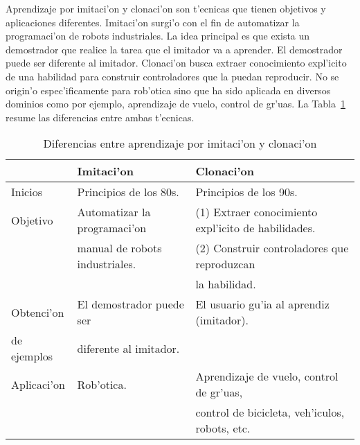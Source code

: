 \documentclass[11pt]{article}
\begin{document}
\textsf{Aprendizaje por imitaci'on} y \textsf{clonaci'on} son t'ecnicas que tienen objetivos y aplicaciones diferentes. Imitaci'on surgi'o con el fin de automatizar la programaci'on de robots industriales. La idea principal es que exista un demostrador que realice la tarea que el imitador va a aprender. El demostrador puede ser diferente al imitador. \textsf{Clonaci'on} busca extraer conocimiento expl'icito de una habilidad para construir controladores que la puedan reproducir. No se origin'o espec'ificamente para rob'otica sino que ha sido aplicada en diversos dominios como por ejemplo, aprendizaje de vuelo, control de gr'uas. La Tabla~\ref{tab:imiclon} resume las diferencias entre ambas t'ecnicas.

\begin{table}[h]
\begin{center}
\begin{small}
\begin{tabular}{|l|l|l|} 

\hline
& \textsf{Imitaci'on}  & \textsf{Clonaci'on}\\
\hline
Inicios & Principios de los 80s.  &    Principios de los 90s.\\ \hline
Objetivo& Automatizar la programaci'on  & (1) Extraer conocimiento expl'icito de habilidades.\\ 
				& manual de robots industriales. & (2) Construir controladores que reproduzcan\\ 
				& 															 & \hspace{0.5cm} la habilidad.\\ \hline
Obtenci'on 		& 	El demostrador puede ser 		 	&  El usuario gu'ia al aprendiz (imitador).\\ 
de ejemplos		& 	diferente al imitador.		 		&  \\ \hline
Aplicaci'on 		& 	Rob'otica. 		 	&  Aprendizaje de vuelo, control de gr'uas,\\ 
											 		& 								 	&  control de bicicleta, veh'iculos, robots, etc. \\ 
\hline

\end{tabular}
\end{small}
\end{center}
\caption[Diferencias entre \textsf{imitaci'on} y \textsf{clonaci'on}]{Diferencias entre \textsf{aprendizaje por imitaci'on} y \textsf{clonaci'on}}
\label{tab:imiclon}
\end{table} 
\end{document}
